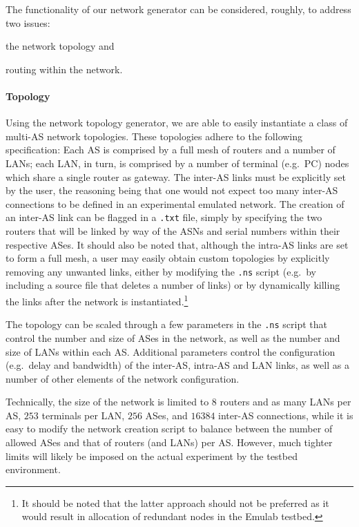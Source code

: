 The functionality of our network generator can be considered, roughly, to
address two issues:
\begin{inparaenum}[(a)]
\item the network topology and
\item routing within the network.
\end{inparaenum}

\paragraph{Topology}

Using the network topology generator, we are able to easily instantiate a
class of multi-AS network topologies. These topologies adhere to the
following specification: Each AS is comprised by a full mesh of routers and
a number of LANs; each LAN, in turn, is comprised by a number of terminal
(e.g.\ PC) nodes which share a single router as gateway. The inter-AS links
must be explicitly set by the user, the reasoning being that one would not
expect too many inter-AS connections to be defined in an experimental
emulated network. The creation of an inter-AS link can be flagged in a
\texttt{.txt} file, simply by specifying the two routers that will be
linked by way of the ASNs and serial numbers within their respective
ASes. It should also be noted that, although the intra-AS links are set to
form a full mesh, a user may easily obtain custom topologies by explicitly
removing any unwanted links, either by modifying the \texttt{.ns} script
(e.g.\ by including a source file that deletes a number of links) or by
dynamically killing the links after the network is
instantiated.\footnote{It should be noted that the latter approach should
  not be preferred as it would result in allocation of redundant nodes in
  the Emulab testbed.}

The topology can be scaled through a few parameters in the \texttt{.ns}
script that control the number and size of ASes in the network, as well as
the number and size of LANs within each AS. Additional parameters control
the configuration (e.g.\ delay and bandwidth) of the inter-AS, intra-AS and
LAN links, as well as a number of other elements of the network
configuration.

Technically, the size of the network is limited to $8$ routers and as many
LANs per AS, $253$ terminals per LAN, $256$ ASes, and $16384$ inter-AS
connections, while it is easy to modify the network creation script to
balance between the number of allowed ASes and that of routers (and LANs)
per AS. However, much tighter limits will likely be imposed on the actual
experiment by the testbed environment.

